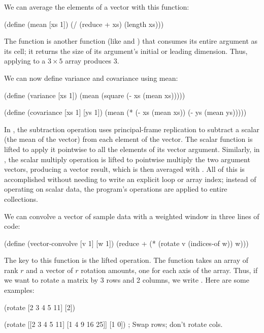 
We can average the elements of a vector with this function:
\begin{code}
    (define (mean [xs 1])
      (/ (reduce + xs)
         (length xs)))\end{code}
The  function is another function
(like  and )
that consumes its entire argument as its cell;
it returns the size of its argument's initial or leading dimension.
Thus, applying  to a $3 \times 5$ array produces $3$.

We can now define variance and covariance using mean:
\begin{code}
    (define (variance [xs 1])
      (mean (square (- xs (mean xs)))))

    (define (covariance [xs 1] [ys 1])
      (mean (* (- xs (mean xs))
               (- ys (mean ys)))))\end{code}
In , the subtraction operation uses principal-frame replication to
subtract a scalar (the mean of the vector) from each element of the vector.
The scalar  function is lifted to apply it
pointwise to all the elements of its vector argument.
Similarly, in , the scalar multiply operation \ex{*} is
lifted to pointwise multiply the two argument vectors,
producing a vector result, which is then averaged with .
All of this is accomplished without needing to write an explicit loop
or array index;
instead of operating on scalar data, the program's operations are applied
to entire collections.

We can convolve a vector of sample data  with a weighted window 
in three lines of code:\label{example:convolve1}
\begin{code}
    (define (vector-convolve [v 1] [w 1])
      (reduce + (* (rotate v (indices-of w))
                   w)))\end{code}
The key to this function is the lifted  operation.
The  function takes an array of rank $r$
and a vector of $r$ rotation amounts, one for each axis of the array.
Thus, if we want to rotate a matrix  by 3 rows and 2 columns, we write
.
Here are some examples:
\begin{code}
    (rotate [2 3 4 5 11] [2])
\result{[4 5 11 2 3]}

    (rotate [[2 3 4  5 11]
             [1 4 9 16 25]]
            [1 0]) ; Swap rows; don't rotate cols.
\result{[[1 4 9 16 25]
 [2 3 4  5 11]]}\end{code}

